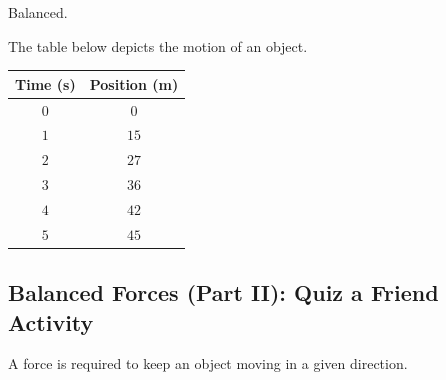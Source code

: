 \documentclass[../main-physics-problems.tex]{subfiles}
\begin{document}
\begin{questions}
\begin{parts}
\begin{solution}
    Balanced.
\end{solution}
\end{parts}

\clearpage
\question
The table below depicts the motion of an object.

\begin{center}
    \begin{tabular}{|c|c|}
        \hline
        \textbf{Time} (s) & \textbf{Position} (m) \\ \hline
        $0$ & $0$ \\ \hline 
        $1$ & $15$ \\ \hline
        $2$ & $27$ \\ \hline
        $3$ & $36$ \\ \hline
        $4$ & $42$ \\ \hline
        $5$ & $45$ \\ \hline
    \end{tabular}
\end{center}



\clearpage
\begin{EnvUplevel}
    \subsection{Balanced Forces (Part II): Quiz a Friend Activity}
\end{EnvUplevel}

\question
A force is required to keep an object moving in a given direction.


\end{questions}
\end{document}
